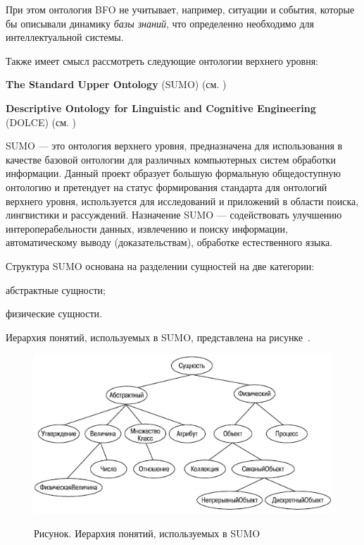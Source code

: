 При этом онтология BFO не учитывает, например, ситуации и события, которые бы описывали динамику \textit{базы знаний}, что определенно необходимо для интеллектуальной системы.

Также имеет смысл рассмотреть следующие онтологии верхнего уровня:
\begin{textitemize}
	\item{\textbf{The Standard Upper Ontology} (SUMO) (см. )}
	\item{\textbf{Descriptive Ontology for Linguistic and Cognitive Engineering} (DOLCE) (см. )}
\end{textitemize}

SUMO --- это онтология верхнего уровня, предназначена для использования в качестве базовой онтологии для различных компьютерных систем обработки информации. Данный проект образует большую формальную общедоступную онтологию и претендует на статус формирования стандарта для онтологий верхнего уровня, используется для исследований и приложений в области поиска, лингвистики и рассуждений. Назначение SUMO --- содействовать улучшению интероперабельности данных, извлечению и поиску информации, автоматическому выводу (доказательствам), обработке естественного языка.

Структура SUMO основана на разделении сущностей на две категории:
\begin{textitemize}
	\item абстрактные сущности;
	\item физические сущности.
\end{textitemize}

Иерархия понятий, используемых в SUMO, представлена на рисунке~\textit{}.

\begin{figure}[H]
	\caption{Рисунок. Иерархия понятий, используемых в SUMO}
	\includegraphics[scale=0.8]{author/part2/figures/chapter_kb/sumo.png}
	\label{fig:sumo}
\end{figure}

